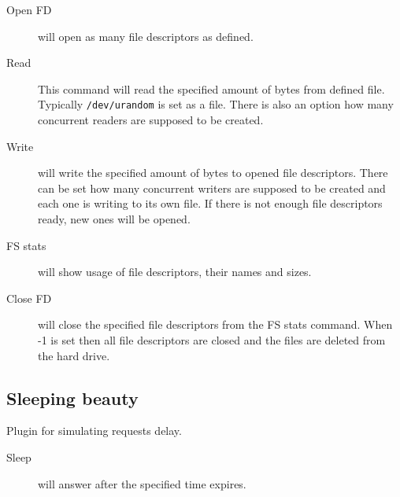 \begin{description}
  \item[Open FD] will open as many file descriptors as defined.
  \item[Read] This command will read the specified amount of bytes from defined file. Typically \lstinline{/dev/urandom} is set as a file. There is also an option how many concurrent readers are supposed to be created.
  \item[Write] will write the specified amount of bytes to opened file descriptors. There can be set how many concurrent writers are supposed to be created and each one is writing to its own file. If there is not enough file descriptors ready, new ones will be opened.
  \item[FS stats] will show usage of file descriptors, their names and sizes.
  \item[Close FD] will close the specified file descriptors from the FS stats command. When -1 is set then all file descriptors are closed and the files are deleted from the hard drive.
\end{description}

\subsection{Sleeping beauty}
Plugin for simulating requests delay.
\begin{description}
  \item[Sleep] will answer after the specified time expires.
\end{description}
